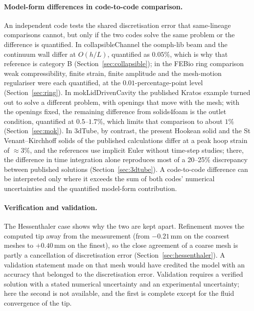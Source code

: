 \paragraph{Model-form differences in code-to-code comparison.}
An independent code tests the shared discretisation error that same-lineage comparisons cannot, but only if the two codes solve the same problem or the difference is quantified.
In collapsibleChannel the oomph-lib beam and the continuum wall differ at $O(h/L)$, quantified as $0.05\%$, which is why that reference is category B (Section~\ref{sec:collapsible}); in the FEBio ring comparison weak compressibility, finite strain, finite amplitude and the mesh-motion regulariser were each quantified, at the $0.01$-percentage-point level (Section~\ref{sec:ring}).
In mokLidDrivenCavity the published Kratos example turned out to solve a different problem, with openings that move with the mesh; with the openings fixed, the remaining difference from solids4foam is the outlet condition, quantified at $0.5$--$1.7\%$, which limits that comparison to about $1\%$ (Section~\ref{sec:mok}).
In 3dTube, by contrast, the present Hookean solid and the St Venant--Kirchhoff solids of the published calculations differ at a peak hoop strain of $\approx3\%$, and the references use implicit Euler without time-step studies; there, the difference in time integration alone reproduces most of a 20--25\% discrepancy between published solutions (Section~\ref{sec:3dtube}).
A code-to-code difference can be interpreted only where it exceeds the sum of both codes' numerical uncertainties and the quantified model-form contribution.

\paragraph{Verification and validation.}
The Hessenthaler case shows why the two are kept apart.
Refinement moves the computed tip away from the measurement (from $-0.21\,\mathrm{mm}$ on the coarsest meshes to $+0.40\,\mathrm{mm}$ on the finest), so the close agreement of a coarse mesh is partly a cancellation of discretisation error (Section~\ref{sec:hessenthaler}).
A validation statement made on that mesh would have credited the model with an accuracy that belonged to the discretisation error.
Validation requires a verified solution with a stated numerical uncertainty and an experimental uncertainty; here the second is not available, and the first is complete except for the fluid convergence of the tip.

